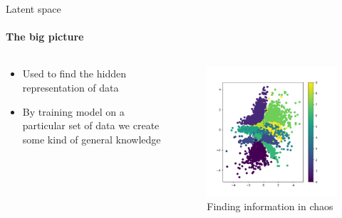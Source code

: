 \documentclass{beamer}
\begin{document}
\begin{frame}{Latent space}
\framesubtitle{The big picture}



\begin{columns}
\begin{column}{0.5\textwidth}
    \begin{itemize}
    \item Used to find the hidden representation of data
    
    \item By training model on a particular set of data we create some kind of general knowledge
    
    \end{itemize}   
\end{column}
\begin{column}{0.5\textwidth}  %
\begin{figure}
    \begin{center}
    \includegraphics[width = .7\textwidth]{images/latent-space.png}
    \caption{Finding information in chaos}    
    \end{center}{}
    
\end{figure}
\end{column}

\end{columns}
    
\end{frame}
\end{document}
